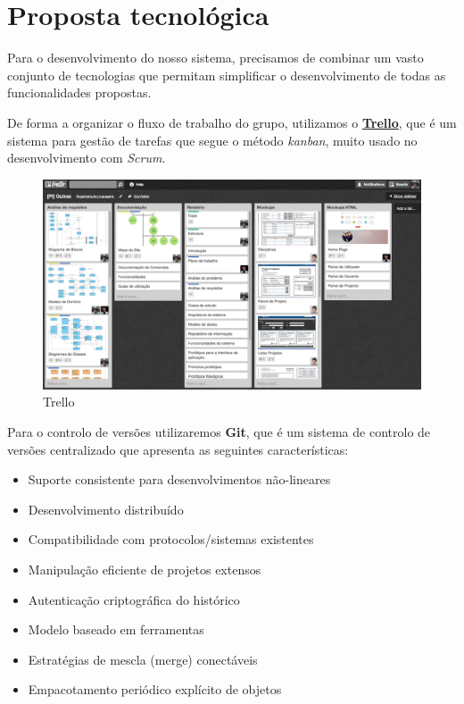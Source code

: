 \section{Proposta tecnológica}

Para o desenvolvimento do nosso sistema, precisamos de combinar um vasto conjunto de tecnologias que permitam simplificar o desenvolvimento de todas as funcionalidades propostas.

De forma a organizar o fluxo de trabalho do grupo, utilizamos o \href{https://trello.com/}{\textbf{Trello}}, que é um sistema para gestão de tarefas que segue o método \textit{kanban}, muito usado no desenvolvimento com \textit{Scrum}. 

\begin{figure}[H] 
  \centering
  \includegraphics[width=1\textwidth]{images/tecnologias/trello}
  \caption{Trello}
  \label{fig:trello}
\end{figure}

Para o controlo de versões utilizaremos \textbf{Git}, que é um sistema de controlo de versões centralizado que apresenta as seguintes características:

\begin{itemize}
  \item Suporte consistente para desenvolvimentos não-lineares
  \item Desenvolvimento distribuído
  \item Compatibilidade com protocolos/sistemas existentes
  \item Manipulação eficiente de projetos extensos  
  \item Autenticação criptográfica do histórico 
  \item Modelo baseado em ferramentas 
  \item Estratégias de mescla (merge) conectáveis
  \item Empacotamento periódico explícito de objetos  
\end{itemize}

